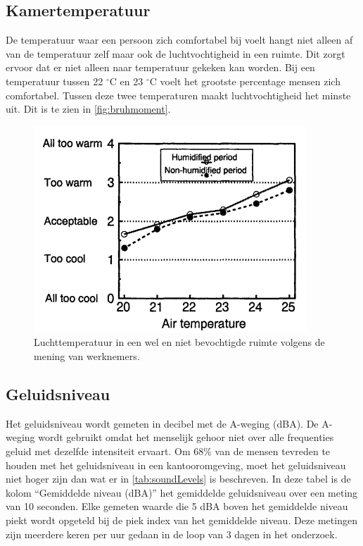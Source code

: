 \subsection{Kamertemperatuur}
De temperatuur waar een persoon zich comfortabel bij voelt hangt niet alleen af van de temperatuur zelf maar ook de luchtvochtigheid in een ruimte\cite{palonen1993effects}. Dit zorgt ervoor dat er niet alleen naar temperatuur gekeken kan worden. Bij een temperatuur tussen 22 $^{\circ}$C en 23 $^{\circ}$C voelt het grootste percentage mensen zich comfortabel. Tussen deze twee temperaturen maakt luchtvochtigheid het minste uit. Dit is te zien in \autoref{fig:bruhmoment}.
\begin{figure}[ht]
    \centering
    \includegraphics[scale=0.65]{img/tempHumidGraph.png}
    \caption{Luchttemperatuur in een wel en niet bevochtigde ruimte volgens de mening van werknemers\cite{palonen1993effects}.}
    \label{fig:bruhmoment}
\end{figure}


\subsection{Geluidsniveau}
Het geluidsniveau wordt gemeten in decibel met de A-weging (dBA)\cite{aWeighting}. De A-weging wordt gebruikt omdat het menselijk gehoor niet over alle frequenties geluid met dezelfde intensiteit ervaart. Om 68\% van de mensen tevreden te houden met het geluidsniveau in een kantooromgeving, moet het geluidsniveau niet hoger zijn dan wat er in \autoref{tab:soundLevels} is beschreven\cite{geluid-levels}. In deze tabel is de kolom ``Gemiddelde niveau (dBA)'' het gemiddelde geluidsniveau over een meting van 10 seconden. Elke gemeten waarde die 5 dBA boven het gemiddelde niveau piekt wordt opgeteld bij de piek index van het gemiddelde niveau. Deze metingen zijn meerdere keren per uur gedaan in de loop van 3 dagen in het onderzoek\cite{geluid-levels}. 

